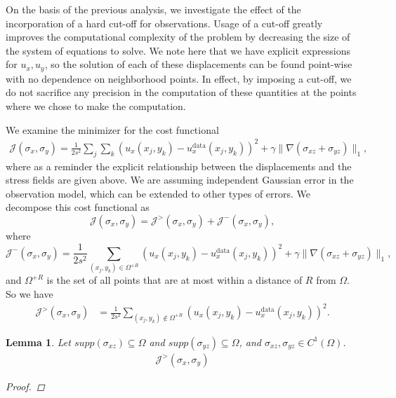 \documentclass{article}
\newtheorem{lemma}[theorem]{Lemma}
\begin{document}
On the basis of the previous analysis, we investigate the effect of the incorporation of a hard cut-off for observations. Usage of a cut-off greatly improves the computational complexity of the problem by decreasing the size of the system of equations to solve. We note here that we have explicit expressions for $u_x,u_y$, so the solution of each of these displacements can be found point-wise with no dependence on neighborhood points. In effect, by imposing a cut-off, we do not sacrifice any precision in the computation of these quantities at the points where we chose to make the computation.

We examine the minimizer for the cost functional
\begin{align}
\mathcal{J}(\sigma_x,\sigma_y) = \frac{1}{2s^2}\sum_j\sum_k \left(u_x(x_j,y_k) - u^{\textrm{data}}_x(x_j,y_k)\right)^2 +  \gamma \| \nabla (\sigma_{xz} + \sigma_{yz}) \|_1,
\end{align}
where as a reminder the explicit relationship between the displacements and the stress fields are given above. We are assuming independent Gaussian error in the observation model, which can be extended to other types of errors. We decompose this cost functional as
\begin{equation}
\mathcal{J}(\sigma_x,\sigma_y) = \mathcal{J}^{>}(\sigma_x,\sigma_y) + \mathcal{J}^{-}(\sigma_x,\sigma_y), 
\end{equation}
where 
\begin{equation}
 \mathcal{J}^{-}(\sigma_x,\sigma_y)=  \frac{1}{2s^2}\sum_{(x_j,y_k)\in\Omega^{+R}} \left(u_x(x_j,y_k) - u^{\textrm{data}}_x(x_j,y_k)\right)^2 +  \gamma \| \nabla (\sigma_{xz} + \sigma_{yz}) \|_1 , 
\end{equation}
and $\Omega^{+R}$ is the set of all points that are at most within a distance of $R$ from $\Omega$. So we have
\begin{align}
 \mathcal{J}^{>}(\sigma_x,\sigma_y)  &= \frac{1}{2s^2} \sum_{(x_j,y_k)\not\in\Omega^{+R}}  \left(u_x(x_j,y_k) - u^{\textrm{data}}_x(x_j,y_k)\right)^2.
\end{align}

\begin{lemma}
Let $supp(\sigma_{xz}) \subseteq \Omega$ and $supp(\sigma_{yz}) \subseteq\Omega$, and  $\sigma_{xz}, \sigma_{yz} \in C^1(\Omega)$.
\begin{align}
 \mathcal{J}^{>}(\sigma_x,\sigma_y)   
\end{align}
\begin{proof}

\end{proof}
\end{lemma}
\end{document}
